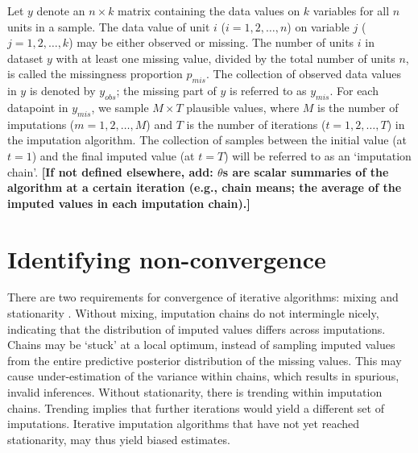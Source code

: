 \documentclass[Royal,times,sageh]{sagej}
\begin{document}
Let \(y\) denote an \(n \times k\) matrix containing the data values on \(k\) variables for all \(n\) units in a sample. The data value of unit \(i\) (\(i = 1, 2, \dots, n\)) on variable \(j\) (\(j = 1, 2, \dots, k\)) may be either observed or missing. The number of units \(i\) in dataset \(y\) with at least one missing value, divided by the total number of units \(n\), is called the missingness proportion \(p_{mis}\). The collection of observed data values in \(y\) is denoted by \(y_{obs}\); the missing part of \(y\) is referred to as \(y_{mis}\). For each datapoint in \(y_{mis}\), we sample \(M \times T\) plausible values, where \(M\) is the number of imputations (\(m = 1, 2, \dots, M\)) and \(T\) is the number of iterations (\(t = 1, 2, \dots, T\)) in the imputation algorithm. The collection of samples between the initial value (at \(t=1\)) and the final imputed value (at \(t=T\)) will be referred to as an `imputation chain'. \textbf{{[}If not defined elsewhere, add: \(\theta\)s are scalar summaries of the algorithm at a certain iteration (e.g., chain means; the average of the imputed values in each imputation chain).{]} }

\hypertarget{identifying-non-convergence}{%
\section{Identifying non-convergence}\label{identifying-non-convergence}}

There are two requirements for convergence of iterative algorithms: mixing and stationarity \citep{gelm13}. Without mixing, imputation chains do not intermingle nicely, indicating that the distribution of imputed values differs across imputations. Chains may be `stuck' at a local optimum, instead of sampling imputed values from the entire predictive posterior distribution of the missing values. This may cause under-estimation of the variance within chains, which results in spurious, invalid inferences. Without stationarity, there is trending within imputation chains. Trending implies that further iterations would yield a different set of imputations. Iterative imputation algorithms that have not yet reached stationarity, may thus yield biased estimates.
\end{document}
